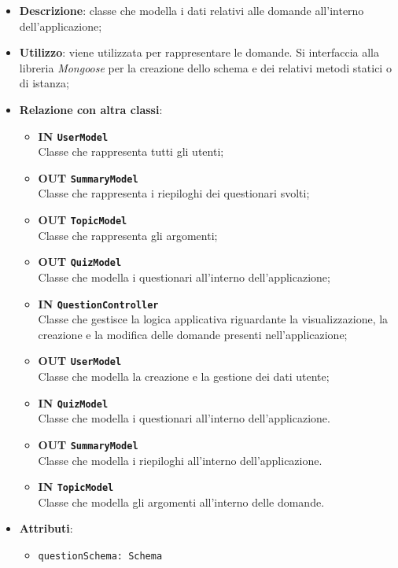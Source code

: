 	\begin{itemize}
		\item \textbf{Descrizione}: classe che modella i dati relativi alle domande all'interno dell'applicazione;	
		\item \textbf{Utilizzo}: viene utilizzata per rappresentare le domande. Si interfaccia alla libreria \textit{Mongoose} per la creazione dello schema e dei relativi metodi statici o di istanza;
		\item \textbf{Relazione con altra classi}:
			\begin{itemize}
			\item \textbf{IN \texttt{UserModel}} \\
			Classe che rappresenta tutti gli utenti;
			\item \textbf{OUT \texttt{SummaryModel} }\\
			Classe che rappresenta i riepiloghi dei questionari svolti;
			\item \textbf{OUT \texttt{TopicModel}} \\
			Classe che rappresenta gli argomenti;
			\item \textbf{OUT \texttt{QuizModel}} \\
			Classe che modella i questionari all'interno dell'applicazione;
			\item \textbf{IN \texttt{QuestionController}} \\
			Classe che gestisce la logica applicativa riguardante la visualizzazione, la creazione e la modifica delle domande presenti nell'applicazione;
			\item \textbf{OUT \texttt{UserModel}} \\
			Classe che modella la creazione e la gestione dei dati utente;
			\item \textbf{IN \texttt{QuizModel}} \\
			Classe che modella i questionari all'interno dell'applicazione.
			\item \textbf{OUT \texttt{SummaryModel}} \\
			Classe che modella i riepiloghi all'interno dell'applicazione.
			\item \textbf{IN \texttt{TopicModel}} \\
			Classe che modella gli argomenti all'interno delle domande.
			\end{itemize}
		\item \textbf{Attributi}:
	\begin{itemize}
		\item \texttt{questionSchema: Schema} \\

\end{itemize}
\end{itemize}
